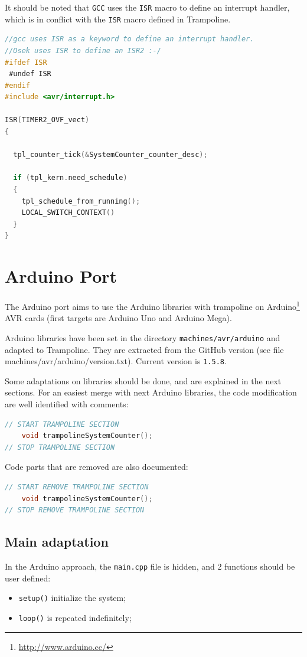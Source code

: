 It should be noted that \texttt{GCC} uses the \texttt{ISR} macro to define an interrupt handler, which is in conflict with the \texttt{ISR} macro defined in Trampoline.

\begin{lstlisting}[language=C]
//gcc uses ISR as a keyword to define an interrupt handler.
//Osek uses ISR to define an ISR2 :-/
#ifdef ISR
 #undef ISR
#endif
#include <avr/interrupt.h>

ISR(TIMER2_OVF_vect)
{

  tpl_counter_tick(&SystemCounter_counter_desc);

  if (tpl_kern.need_schedule)
  {
    tpl_schedule_from_running();
    LOCAL_SWITCH_CONTEXT()
  }
}	
\end{lstlisting}

\section{Arduino Port}
The Arduino port aims to use the Arduino libraries with trampoline on Arduino\footnote{\url{http://www.arduino.cc/}} AVR cards (first targets are Arduino Uno and Arduino Mega).

Arduino libraries have been set in the directory \texttt{machines/avr/arduino} and adapted to Trampoline. They are extracted from the GitHub version (see file machines/avr/arduino/version.txt). Current version is \texttt{1.5.8}.

Some adaptations on libraries should be done, and are explained in the next sections. For an easiest merge with next Arduino libraries, the code modification are well identified with comments:

\begin{lstlisting}[language=C]
// START TRAMPOLINE SECTION 
	void trampolineSystemCounter();
// STOP TRAMPOLINE SECTION 
\end{lstlisting}

Code parts that are removed are also documented:
\begin{lstlisting}[language=C]
// START REMOVE TRAMPOLINE SECTION
	void trampolineSystemCounter();
// STOP REMOVE TRAMPOLINE SECTION
\end{lstlisting}

\subsection{Main adaptation}
In the Arduino approach, the \texttt{main.cpp} file is hidden, and 2 functions should be user defined:
\begin{itemize}
\item \texttt{setup()} initialize the system;
\item \texttt{loop()} is repeated indefinitely;
\end{itemize}

